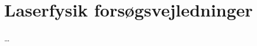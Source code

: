 \documentclass[crop=false, class=memoir]{standalone}
\begin{document}
\chapter{Laserfysik forsøgsvejledninger} \label{chap:laser_vejl}

\ldots











\end{document}
